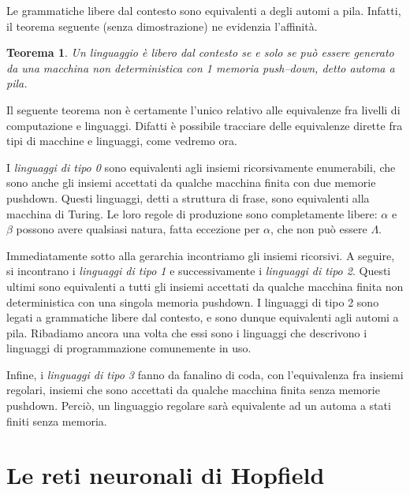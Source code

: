 \documentclass[10pt]{\classname}
\theoremstyle{newlinethm}
\newtheorem{thm}{Teorema}[section]
\theoremstyle{theorem}
\theoremstyle{definition}
\theoremstyle{definition}
\theoremstyle{definition}
\theoremstyle{definition}
\begin{document}
Le grammatiche libere dal contesto sono equivalenti a degli automi a pila. Infatti, il teorema seguente (senza dimostrazione) ne evidenzia l'affinità.

\begin{thm}
    Un linguaggio è \emph{libero dal contesto} se e solo se può essere generato
    da una macchina non deterministica con 1 memoria push--down, detto automa a
    pila.
\end{thm}

Il seguente teorema non è certamente l'unico relativo alle equivalenze fra livelli di computazione e linguaggi. Difatti è possibile tracciare delle equivalenze dirette fra tipi di macchine e linguaggi, come vedremo ora.

I \emph{linguaggi di tipo 0} sono equivalenti agli insiemi ricorsivamente enumerabili, che sono anche gli insiemi accettati da qualche macchina finita con due memorie pushdown. Questi linguaggi, detti a struttura di frase, sono equivalenti alla macchina di Turing. Le loro regole di produzione sono completamente libere: $\alpha$ e $\beta$ possono avere qualsiasi natura, fatta eccezione per $\alpha$, che non può essere $\Lambda$.

Immediatamente sotto alla gerarchia incontriamo gli insiemi ricorsivi. A seguire, si incontrano i \emph{linguaggi di tipo 1} e successivamente i \emph{linguaggi di tipo 2}. Questi ultimi sono equivalenti a tutti gli insiemi accettati da qualche macchina finita non deterministica con una singola memoria pushdown. I linguaggi di tipo 2 sono legati a grammatiche libere dal contesto, e sono dunque equivalenti agli automi a pila. Ribadiamo ancora una volta che essi sono i linguaggi che descrivono i linguaggi di programmazione comunemente in uso.

Infine, i \emph{linguaggi di tipo 3} fanno da fanalino di coda, con l'equivalenza fra insiemi regolari, insiemi che sono accettati da qualche macchina finita senza memorie pushdown. Perciò, un linguaggio regolare sarà equivalente ad un automa a stati finiti senza memoria.


\chapter{Le reti neuronali di Hopfield}
\end{document}
